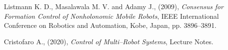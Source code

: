\documentclass[11pt]{article}
\begin{document}
\begin{thebibliography}{2}

	Listmann K. D., Masalawala M. V. and Adamy J., (2009), \textit{Consensus for Formation Control of 			Nonholonomic Mobile Robots}, IEEE International Conference on Robotics and Automation, Kobe, Japan, 		pp. 3896--3891.
	
	Cristofaro A., (2020), \textit{Control of Multi--Robot Systems}, Lecture Notes.


\end{thebibliography}
\end{document}
